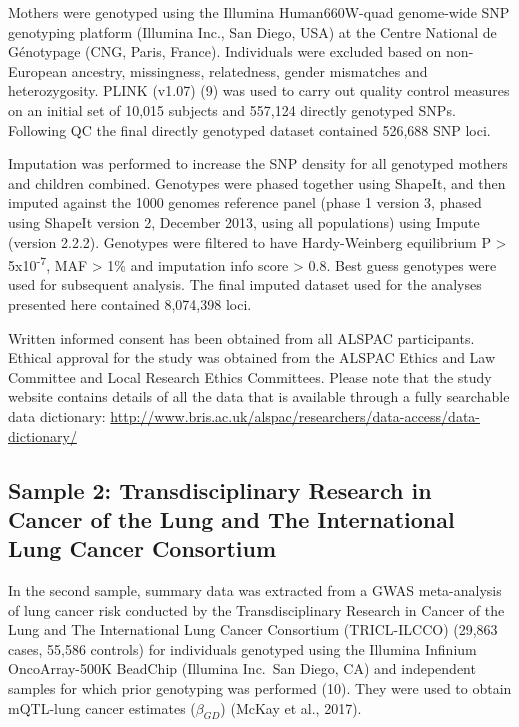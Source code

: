 \documentclass[11pt,twoside]{bristolthesis}
\begin{document}
Mothers were genotyped using the Illumina Human660W-quad genome-wide SNP genotyping platform (Illumina Inc., San Diego, USA) at the Centre National de Génotypage (CNG, Paris, France). Individuals were excluded based on non-European ancestry, missingness, relatedness, gender mismatches and heterozygosity. PLINK (v1.07) (9) was used to carry out quality control measures on an initial set of 10,015 subjects and 557,124 directly genotyped SNPs. Following QC the final directly genotyped dataset contained 526,688 SNP loci.

Imputation was performed to increase the SNP density for all genotyped mothers and children combined. Genotypes were phased together using ShapeIt, and then imputed against the 1000 genomes reference panel (phase 1 version 3, phased using ShapeIt version 2, December 2013, using all populations) using Impute (version 2.2.2). Genotypes were filtered to have Hardy-Weinberg equilibrium P \textgreater{} 5x10\textsuperscript{-7}, MAF \textgreater{} 1\% and imputation info score \textgreater{} 0.8. Best guess genotypes were used for subsequent analysis. The final imputed dataset used for the analyses presented here contained 8,074,398 loci.

Written informed consent has been obtained from all ALSPAC participants. Ethical approval for the study was obtained from the ALSPAC Ethics and Law Committee and Local Research Ethics Committees.
Please note that the study website contains details of all the data that is available through a fully searchable data dictionary: \url{http://www.bris.ac.uk/alspac/researchers/data-access/data-dictionary/}

\hypertarget{sample-2-transdisciplinary-research-in-cancer-of-the-lung-and-the-international-lung-cancer-consortium}{%
\subsection{Sample 2: Transdisciplinary Research in Cancer of the Lung and The International Lung Cancer Consortium}\label{sample-2-transdisciplinary-research-in-cancer-of-the-lung-and-the-international-lung-cancer-consortium}}

In the second sample, summary data was extracted from a GWAS meta-analysis of lung cancer risk conducted by the Transdisciplinary Research in Cancer of the Lung and The International Lung Cancer Consortium (TRICL-ILCCO) (29,863 cases, 55,586 controls) for individuals genotyped using the Illumina Infinium OncoArray-500K BeadChip (Illumina Inc.~San Diego, CA) and independent samples for which prior genotyping was performed (10). They were used to obtain mQTL-lung cancer estimates (\(\beta_{GD}\)) (McKay et al., 2017).
\end{document}
